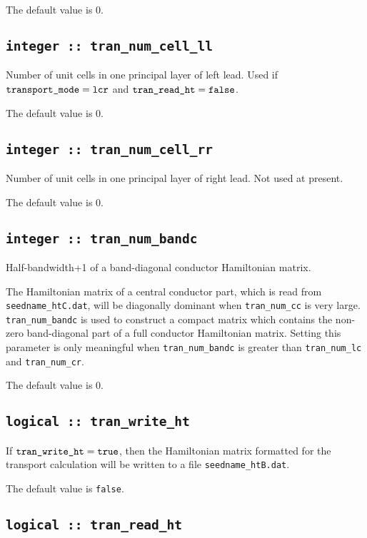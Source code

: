 The default value is 0.

\subsection[tran\_num\_cell\_ll]{\tt integer :: tran\_num\_cell\_ll}
Number of unit cells in one principal layer of left lead. 
Used if $\verb#transport_mode# = \verb#lcr#$ and 
$\verb#tran_read_ht# = \verb#false#$.

The default value is 0. 
 
\subsection[tran\_num\_cell\_rr]{\tt integer :: tran\_num\_cell\_rr}
Number of unit cells in one principal layer of right lead. 
Not used at present.

The default value is 0.

\subsection[tran\_num\_bandc]{\tt integer :: tran\_num\_bandc}

Half-bandwidth+1 of a band-diagonal conductor Hamiltonian matrix.

The Hamiltonian matrix of a central conductor part, which is
read from \verb#seedname_htC.dat#, will be diagonally dominant
when \verb#tran_num_cc# is very large.
\verb#tran_num_bandc# is used to construct
a compact matrix which contains
the non-zero band-diagonal part of a full conductor Hamiltonian matrix. 
Setting this parameter is only meaningful when
\verb#tran_num_bandc# is greater than
\verb#tran_num_lc# and \verb#tran_num_cr#.

The default value is 0.

\subsection[tran\_write\_ht]{\tt logical :: tran\_write\_ht}

If $\verb#tran_write_ht#=\verb#true#$, then the Hamiltonian matrix 
formatted for the transport calculation will be written 
to a file \verb#seedname_htB.dat#.

The default value is {\tt false}.

\subsection[tran\_read\_ht]{\tt logical :: tran\_read\_ht}


